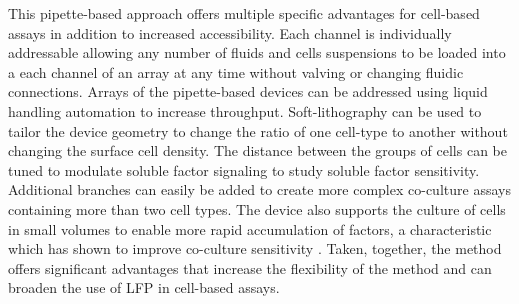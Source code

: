 This pipette-based approach offers multiple specific advantages for cell-based assays in addition to increased accessibility. Each channel is individually addressable allowing any number of fluids and cells suspensions to be loaded into a each channel of an array at any time without valving or changing fluidic connections. Arrays of the pipette-based devices can be addressed using liquid handling automation to increase throughput. Soft-lithography can be used to tailor the device geometry to change the ratio of one cell-type to another without changing the surface cell density. The distance between the groups of cells can be tuned to modulate soluble factor signaling to study soluble factor sensitivity. Additional branches can easily be added to create more complex co-culture assays containing more than two cell types. The device also supports the culture of cells in small volumes to enable more rapid accumulation of factors, a characteristic which has shown to improve co-culture sensitivity \cite{Domenech:2009jt}. Taken, together, the method offers significant advantages that increase the flexibility of the method and can broaden the use of LFP in cell-based assays.


